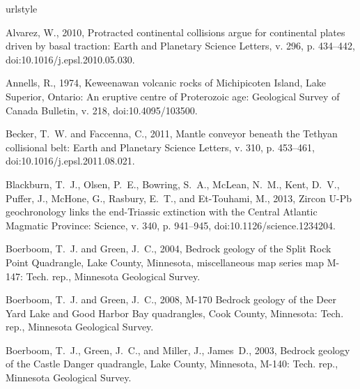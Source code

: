 \documentclass[11pt,letterpaper]{article}
\begin{document}
\newpage
\singlespacing
\footnotesize

\begin{thebibliography}{153}
\providecommand{\natexlab}[1]{#1}
\providecommand{\url}[1]{\texttt{#1}}
\providecommand{\urlprefix}{URL }
\expandafter\ifx\csname urlstyle\endcsname\relax
  \providecommand{\doi}[1]{doi:\discretionary{}{}{}#1}\else
  \providecommand{\doi}{doi:\discretionary{}{}{}\begingroup
  \urlstyle{rm}\Url}\fi

Alvarez, W., 2010, Protracted continental collisions argue for continental
  plates driven by basal traction: Earth and Planetary Science Letters, v. 296,
  p. 434--442, \doi{10.1016/j.epsl.2010.05.030}.

Annells, R., 1974, Keweenawan volcanic rocks of {M}ichipicoten {I}sland, {L}ake
  {S}uperior, {O}ntario: An eruptive centre of {P}roterozoic age: Geological
  Survey of Canada Bulletin, v. 218, \doi{10.4095/103500}.

Becker, T.~W. and Faccenna, C., 2011, Mantle conveyor beneath the {T}ethyan
  collisional belt: Earth and Planetary Science Letters, v. 310, p. 453--461,
  \doi{10.1016/j.epsl.2011.08.021}.

Blackburn, T.~J., Olsen, P.~E., Bowring, S.~A., McLean, N.~M., Kent, D.~V.,
  Puffer, J., McHone, G., Rasbury, E.~T., and Et-Touhami, M., 2013, Zircon
  {U-Pb} geochronology links the end-{T}riassic extinction with the {Central
  Atlantic Magmatic Province}: Science, v. 340, p. 941--945,
  \doi{10.1126/science.1234204}.

Boerboom, T.~J. and Green, J.~C., 2004, Bedrock geology of the {Split Rock
  Point Quadrangle, Lake County, Minnesota}, miscellaneous map series map
  {M}-147: Tech. rep., Minnesota Geological Survey.

Boerboom, T.~J. and Green, J.~C., 2008, M-170 {B}edrock geology of the {Deer
  Yard Lake and Good Harbor Bay} quadrangles, {C}ook {C}ounty, {M}innesota:
  Tech. rep., Minnesota Geological Survey.

Boerboom, T.~J., Green, J.~C., and Miller, J., James~D., 2003, {Bedrock geology
  of the Castle Danger quadrangle, Lake County, Minnesota, M-140}: Tech. rep.,
  Minnesota Geological Survey.


\end{thebibliography}
\end{document}
